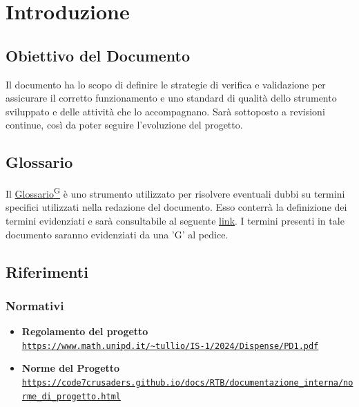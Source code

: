 \documentclass{article}
\begin{document}
\tableofcontents
\listoftables
\listoffigures



\newpage
\section{Introduzione}
\subsection{Obiettivo del Documento}
Il documento ha lo scopo di definire le strategie di verifica e validazione per assicurare il corretto funzionamento e uno standard di qualità
dello strumento sviluppato e delle attività che lo accompagnano. Sarà sottoposto a revisioni continue, così da poter seguire l'evoluzione del progetto.

\subsection{Glossario}
Il \href{https://code7crusaders.github.io/docs/RTB/documentazione_interna/glossario.html#glossario}{Glossario\textsuperscript{G}} è uno strumento utilizzato per risolvere eventuali dubbi su termini specifici utilizzati nella redazione del documento. Esso conterrà la definizione dei 
termini evidenziati e sarà consultabile al seguente \href{https://code7crusaders.github.io/docs/RTB/documentazione_interna/glossario.html}{link}. I termini presenti in tale documento
saranno evidenziati da una 'G' al pedice.

\subsection{Riferimenti}
\subsubsection{Normativi}
\begin{itemize}
    \item \textbf{Regolamento del progetto} \\ \texttt{\url{https://www.math.unipd.it/~tullio/IS-1/2024/Dispense/PD1.pdf}}
    \item \textbf{Norme del Progetto} \\ \texttt{\url{https://code7crusaders.github.io/docs/RTB/documentazione_interna/norme_di_progetto.html}}
\end{itemize}
\end{document}
